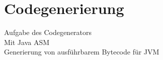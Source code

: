\chapter{Codegenerierung}

Aufgabe des Codegenerators \\
Mit Java ASM\\
Generierung von ausführbarem Bytecode für JVM\\


